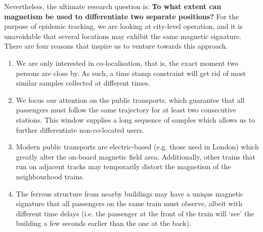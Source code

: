 \documentclass[conference]{IEEEtran}
\begin{document}
Nevertheless, the ultimate research question is: \textbf{To what extent can magnetism be used to differentiate two separate positions?} For the purpose of epidemic tracking, we are looking at city-level operation, and it is unavoidable that several locations may exhibit the same magnetic signature. There are four reasons that inspire us to venture towards this approach. 
\begin{enumerate}
	\item We are only interested in co-localisation, that is, the exact moment two persons are close by. As such, a time stamp constraint will get rid of most similar samples collected at different times. 
	\item We focus our attention on the public transports, which guarantee that all passengers must follow the same trajectory for at least two consecutive stations. This window supplies a long sequence of samples which allows us to further differentiate non-co-located users. 
	\item Modern public transports are electric-based (e.g. those used in London) which greatly alter the on-board magnetic field area. Additionally, other trains that run on adjacent tracks may temporarily distort the magnetism of the neighbourhood trains.
	\item The ferrous structure from nearby buildings may have a unique magnetic signature that all passengers on the same train must observe, albeit with different time delays (i.e. the passenger at the front of the train will `see' the building a few seconds earlier than the one at the back).
\end{enumerate}
\end{document}
